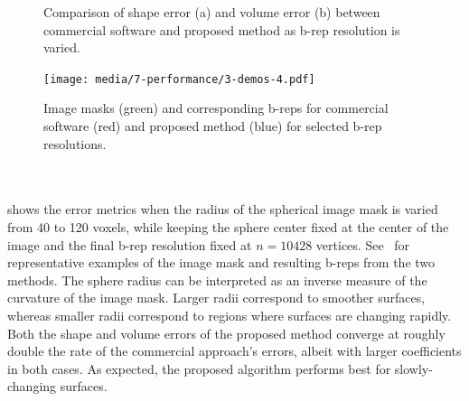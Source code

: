 \begin{figure}[ht!]
\centering
{}
%	
\caption{Comparison of shape error (a) and volume error (b) between commercial software and proposed method as b-rep resolution is varied.}
\label{fig:graph1}
\end{figure}
\begin{figure}[ht!]
	\centering
	\texttt{[image: media/7-performance/3-demos-4.pdf]}
	\caption{Image masks (green) and corresponding b-reps for commercial software (red) and proposed method (blue) for selected b-rep resolutions.}
	\label{fig:demos1}
\end{figure} \\ \\
%
 shows the error metrics when the radius of the spherical image mask is varied from 40 to 120 voxels, while keeping the sphere center fixed at the center of the image and the final b-rep resolution fixed at $n = 10428$ vertices. See~ for representative examples of the image mask and resulting b-reps from the two methods. The sphere radius can be interpreted as an inverse measure of the curvature of the image mask. Larger radii correspond to smoother surfaces, whereas smaller radii correspond to regions where surfaces are changing rapidly. Both the shape and volume errors of the proposed method converge at roughly double the rate of the commercial approach's errors, albeit with larger coefficients in both cases. As expected, the proposed algorithm performs best for slowly-changing surfaces.
